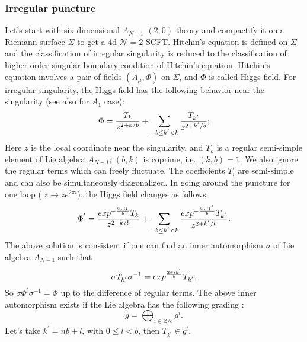 \documentclass[a4paper,11pt]{article}
\begin{document}
\subsubsection{Irregular puncture}
Let's start with six dimensional  $A_{N-1}$ $(2,0)$ theory and compactify it on a Riemann surface $\Sigma$ to get 
a 4d $\mathcal{N}=2$ SCFT.  Hitchin's equation is defined on $\Sigma$ and the  classification of irregular singularity is reduced to the classification of  higher order singular  boundary condition of Hitchin's equation. 
Hitchin's equation involves a pair of fields $(A_\mu, \Phi)$ on $\Sigma$, and $\Phi$ is called Higgs field.  For irregular singularity, the Higgs field has the following behavior near the singularity \cite{Xie:2012hs,Wang:2015mra} (see also \cite{gaiotto2009wall,Cecotti:2011rv,Bonelli:2011aa}  for $A_1$ case):
\begin{equation}
\Phi={T_k\over z^{2+k/b}}+\sum_{-b\leq k^{'}<k} {T_{k^{'}}\over z^{2+k^{'}/b}};
\label{higgs}
\end{equation}
Here $z$ is the local coordinate near the singularity, and $T_k$ is a regular semi-simple element of Lie algebra $A_{N-1}$; $(b, k)$ is coprime, i.e. $(k,b)=1$.
We also ignore the regular terms which can freely fluctuate. The coefficients $T_i$ are semi-simple and can also be 
simultaneously diagonalized. In going around the puncture for one loop ( $z\rightarrow ze^{2\pi i}$), the Higgs field changes as follows
\begin{equation}
\Phi^{'}={exp^{-{2\pi i k \over b}}T_k\over z^{2+k/b}}+\sum_{-b\leq k^{'}<k} {exp^{-{2\pi i k^{'} \over b}}T_{k^{'}}\over z^{2+k^{'}/b}}.
\end{equation}
The above solution is consistent if one can find an inner automorphism $\sigma$ of Lie algebra $A_{N-1}$ such that 
\begin{equation}
\sigma T_{k^{'}} \sigma^{-1}=exp^{{2\pi i k^{'}  \over b}}T_{k^{'}}, 
\label{auto}
\end{equation}
So $\sigma \Phi^{'} \sigma^{-1}=\Phi$ up to the difference of regular terms. 
The above inner automorphism exists if the Lie algebra has the following grading \cite{reeder2012gradings}:
\begin{equation}
g=\bigoplus_{i\in Z/b} g^i.
\end{equation}
Let's take $k^{'}=n b+l$, with $0\leq l<b$, then $T_{k^{'}}\in g^l$.  
\end{document}
